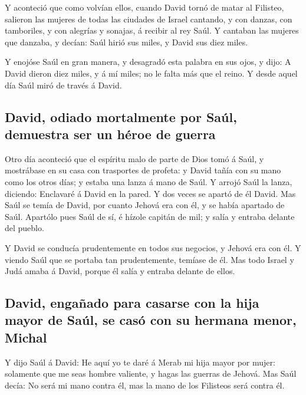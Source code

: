  Y aconteció que como volvían ellos, cuando David tornó de
matar al Filisteo, salieron las mujeres de todas las ciudades de Israel
cantando, y con danzas, con tamboriles, y con alegrías y sonajas, á
recibir al rey Saúl.  Y cantaban las mujeres que danzaba,
y decían: Saúl hirió sus miles, y David sus diez miles.

 Y enojóse Saúl en gran manera, y desagradó esta palabra
en sus ojos, y dijo: A David dieron diez miles, y á mí miles; no le
falta más que el reino.  Y desde aquel día Saúl miró de
través á David.

\hypertarget{david-odiado-mortalmente-por-sauxfal-demuestra-ser-un-huxe9roe-de-guerra}{%
\subsection{David, odiado mortalmente por Saúl, demuestra ser un héroe
de
guerra}\label{david-odiado-mortalmente-por-sauxfal-demuestra-ser-un-huxe9roe-de-guerra}}

 Otro día aconteció que el espíritu malo de parte de Dios
tomó á Saúl, y mostrábase en su casa con trasportes de profeta: y David
tañía con su mano como los otros días; y estaba una lanza á mano de
Saúl.  Y arrojó Saúl la lanza, diciendo: Enclavaré á
David en la pared. Y dos veces se apartó de él David. 
Mas Saúl se temía de David, por cuanto Jehová era con él, y se había
apartado de Saúl.  Apartólo pues Saúl de sí, é hízole
capitán de mil; y salía y entraba delante del pueblo.

 Y David se conducía prudentemente en todos sus negocios,
y Jehová era con él.  Y viendo Saúl que se portaba tan
prudentemente, temíase de él.  Mas todo Israel y Judá
amaba á David, porque él salía y entraba delante de ellos.

\hypertarget{david-engauxf1ado-para-casarse-con-la-hija-mayor-de-sauxfal-se-casuxf3-con-su-hermana-menor-michal}{%
\subsection{David, engañado para casarse con la hija mayor de Saúl, se
casó con su hermana menor,
Michal}\label{david-engauxf1ado-para-casarse-con-la-hija-mayor-de-sauxfal-se-casuxf3-con-su-hermana-menor-michal}}

 Y dijo Saúl á David: He aquí yo te daré á Merab mi hija
mayor por mujer: solamente que me seas hombre valiente, y hagas las
guerras de Jehová. Mas Saúl decía: No será mi mano contra él, mas la
mano de los Filisteos será contra él.


